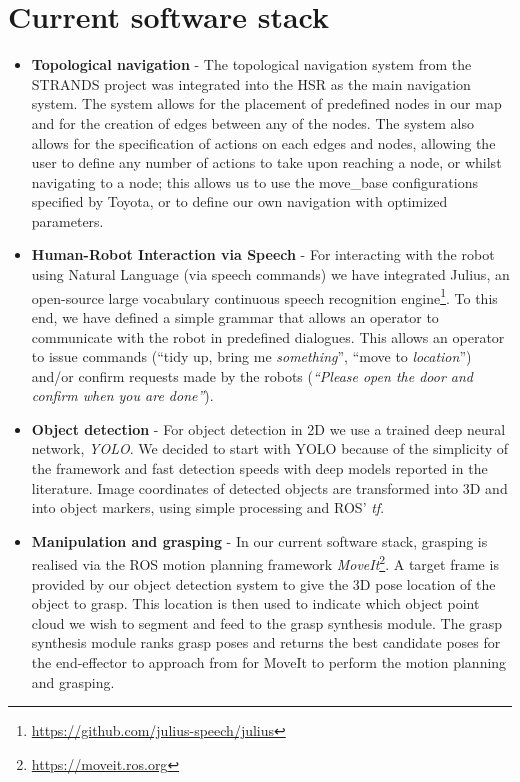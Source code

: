 \documentclass[runningheads,a4paper]{llncs}
\begin{document}
\section{Current software stack}
\begin{itemize}
\item \textbf{Topological navigation} - The topological navigation system from the STRANDS project was integrated into the HSR as the main navigation system. The system allows for the placement of predefined nodes in our map and for the creation of edges between any of the nodes. The system also allows for the specification of actions on each edges and nodes, allowing the user to define any number of actions to take upon reaching a node, or whilst navigating to a node; this allows us to use the move\_base configurations specified by Toyota, or to define our own navigation with optimized parameters. 

\item \textbf{Human-Robot Interaction via Speech} - For interacting with the robot using Natural Language (via speech commands) we have integrated Julius, an open-source large vocabulary continuous speech recognition engine\footnote{\url{https://github.com/julius-speech/julius}}. To this end, we have defined a simple grammar that allows an operator to communicate with the robot in predefined dialogues. This allows an operator to issue commands (``tidy up, bring me \emph{something}'', ``move to \emph{location}'') and/or confirm requests made by the robots (\emph{``Please open the door and confirm when you are done''}).  

\item \textbf{Object detection} - For object detection in 2D we use a trained deep neural network, \textit{YOLO}. We decided to start with YOLO because of the simplicity of the framework and fast detection speeds with deep models reported in the literature. Image coordinates of detected objects are transformed into 3D  and into object markers, using simple processing and ROS' \textit{tf}.  

\item \textbf{Manipulation and grasping} - In our current software stack, grasping is realised via the ROS motion planning framework \textit{MoveIt}\footnote{\url{https://moveit.ros.org}}. A target frame is provided by our object detection system to give the 3D pose location of the object to grasp. This location is then used to indicate which object point cloud we wish to segment and feed to the grasp synthesis module. The grasp synthesis module ranks grasp poses and returns the best candidate poses for the end-effector to approach from for MoveIt to perform the motion planning and grasping. 

\end{itemize}
\end{document}
